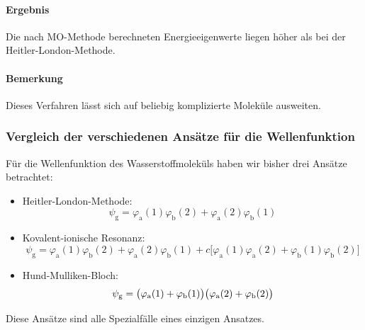 \paragraph{Ergebnis}
	Die nach MO-Methode berechneten Energieeigenwerte liegen höher als bei der Heitler-London-Methode.

\paragraph{Bemerkung}
	Dieses Verfahren lässt sich auf beliebig komplizierte Moleküle ausweiten.

\subsubsection{Vergleich der verschiedenen Ansätze für die Wellenfunktion}
	Für die Wellenfunktion des Wasserstoffmoleküls haben wir bisher drei Ansätze betrachtet:
	\begin{itemize}
		\item Heitler-London-Methode:
			\begin{equation}
				\label{eq:3.61}
				\psi_{\mathrm{g}} = \varphi_\mathrm{a}(1) \varphi_\mathrm{b}(2) + \varphi_\mathrm{a}(2) \varphi_\mathrm{b}(1)
			\end{equation}
		\item Kovalent-ionische Resonanz:
			\begin{equation}
				\label{eq:3.62}
				\psi_{\mathrm{g}} = \varphi_\mathrm{a} (1) \varphi_\mathrm{b}(2) + \varphi_\mathrm{a}(2) \varphi_\mathrm{b}(1) + c\big[ \varphi_\mathrm{a}(1) \varphi_\mathrm{a}(2) + \varphi_\mathrm{b}(1) \varphi_\mathrm{b}(2) \big] 
			\end{equation}
		\item Hund-Mulliken-Bloch:
			\begin{equation}
				\label{eq:3.63}	
				\psi_\mathrm g = \big(\varphi_\text a(1)+\varphi_\text b(1)\big)\big(\varphi_\text a(2)+\varphi_\text b(2)\big)
			\end{equation}
	\end{itemize}

	Diese Ansätze sind alle Spezialfälle eines einzigen Ansatzes. 
